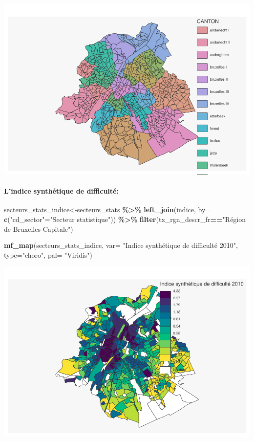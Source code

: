 \documentclass[
]{book}
\newenvironment{Shaded}{\begin{snugshade}}{\end{snugshade}}
\newcommand{\AttributeTok}[1]{\textcolor[rgb]{0.13,0.29,0.53}{#1}}
\newcommand{\FunctionTok}[1]{\textcolor[rgb]{0.13,0.29,0.53}{\textbf{#1}}}
\newcommand{\NormalTok}[1]{#1}
\newcommand{\OtherTok}[1]{\textcolor[rgb]{0.56,0.35,0.01}{#1}}
\newcommand{\SpecialCharTok}[1]{\textcolor[rgb]{0.81,0.36,0.00}{\textbf{#1}}}
\newcommand{\StringTok}[1]{\textcolor[rgb]{0.31,0.60,0.02}{#1}}
\begin{document}
\includegraphics{manuel_geo_quanti_files/figure-latex/unnamed-chunk-34-1.pdf}

\hypertarget{lindice-synthuxe9tique-de-difficultuxe9}{%
\paragraph{L'indice synthétique de difficulté:}\label{lindice-synthuxe9tique-de-difficultuxe9}}

\begin{Shaded}
\begin{Highlighting}[]
\NormalTok{secteurs\_stats\_indice}\OtherTok{\textless{}{-}}\NormalTok{secteurs\_stats }\SpecialCharTok{\%\textgreater{}\%}
  \FunctionTok{left\_join}\NormalTok{(indice, }\AttributeTok{by=} \FunctionTok{c}\NormalTok{(}\StringTok{"cd\_sector"}\OtherTok{=}\StringTok{"Secteur statistique"}\NormalTok{)) }\SpecialCharTok{\%\textgreater{}\%}
  \FunctionTok{filter}\NormalTok{(tx\_rgn\_descr\_fr}\SpecialCharTok{==}\StringTok{"Région de Bruxelles{-}Capitale"}\NormalTok{)}

\FunctionTok{mf\_map}\NormalTok{(secteurs\_stats\_indice,}
       \AttributeTok{var=} \StringTok{"Indice synthétique de difficulté 2010"}\NormalTok{,}
       \AttributeTok{type=}\StringTok{"choro"}\NormalTok{,}
       \AttributeTok{pal=} \StringTok{"Viridis"}\NormalTok{)}
\end{Highlighting}
\end{Shaded}

\includegraphics{manuel_geo_quanti_files/figure-latex/unnamed-chunk-35-1.pdf}
\end{document}
